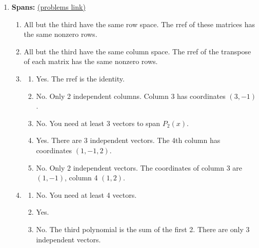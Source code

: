 {\begin{multicols}{2}
\begin{enumerate}
\begin{enumerate}
	\item 
		\begin{enumerate}
			\item No. The zero polynomial does not have degree 2.
			\item No. The sum of two degree 2 polynomials may be lower in degree.  For example $(x^2) + (x-x^2) = x$. So this set is not closed under addition.
			\item Yes. It is spanned by $\{1,x,x^2\}$
			\item No. Similar to part (b).
		\end{enumerate}

\end{enumerate}




\item \textbf{Spans:} \label{span solutions} \hypertarget{span solutions target}{\hyperlink{span problems target}{(problems link)}}

\begin{enumerate}
	\item 
All but the third have the same row space. The rref of these matrices has the same nonzero rows.


	\item 
All but the third have the same column space. The rref of the transpose of each matrix has the same nonzero rows.

	\item 
		\begin{enumerate}
			\item Yes. The rref is the identity.
			\item No. Only 2 independent columns. Column 3 has coordinates $(3,-1)$.
			\item No. You need at least 3 vectors to span $P_2(x)$.
			\item Yes. There are 3 independent vectors.  The 4th column has coordinates $(1,-1,2)$.
			\item No. Only 2 independent vectors. The coordinates of column 3 are $(1,-1)$, column 4 $(1,2)$.
		\end{enumerate}

	\item 
		\begin{enumerate}
			\item No. You need at least 4 vectors.
			\item Yes.
			\item No. The third polynomial is the sum of the first 2.  There are only 3 independent vectors. 
		\end{enumerate}


\end{enumerate}
\end{enumerate}
\end{multicols}}
